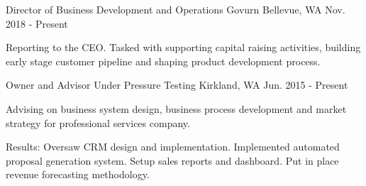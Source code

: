 


\begin{cventries}

\cventry
{Director of Business Development and Operations} %
{Govurn} %
{Bellevue, WA} %
{Nov. 2018 - Present} %
{ %
\begin{cvitems}
\item {Reporting to the CEO. Tasked with supporting capital raising activities, building early stage customer pipeline and shaping product development process.}
\end{cvitems}
}

\cventry
{Owner and Advisor} %
{Under Pressure Testing} %
{Kirkland, WA} %
{Jun. 2015 - Present} %
{ %
	\begin{cvitems}
		\item {Advising on business system design, business process development and market strategy for professional services company.}
	\end{cvitems}
}
\begin{cvitemsnb}
	\item {Results: Oversaw CRM design and implementation. Implemented automated proposal generation system. Setup sales reports and dashboard. Put in place revenue forecasting methodology.}
\end{cvitemsnb}

	

\end{cventries}
